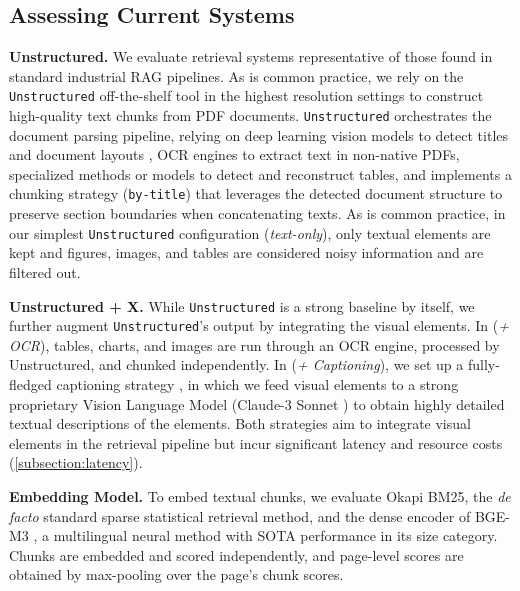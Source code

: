 \subsection{Assessing Current Systems}
\label{subsection:baseline_models}


\noindent\textbf{Unstructured.} We evaluate retrieval systems representative of those found in standard industrial RAG pipelines. As is common practice, we rely on the \texttt{Unstructured} off-the-shelf tool in the highest resolution settings to construct high-quality text chunks from PDF documents. \texttt{Unstructured} orchestrates the document parsing pipeline, relying on deep learning vision models to detect titles and document layouts , OCR engines  to extract text in non-native PDFs, specialized methods or models to detect and reconstruct tables, and implements a chunking strategy (\texttt{by-title}) that leverages the detected document structure to preserve section boundaries when concatenating texts. As is common practice, in our simplest \texttt{Unstructured} configuration (\textit{text-only}), only textual elements are kept and figures, images, and tables are considered noisy information and are filtered out.

\noindent\textbf{Unstructured + X.} While \texttt{Unstructured} is a strong baseline by itself, we further augment \texttt{Unstructured}'s output by integrating the visual elements. In (\textit{+ OCR}), tables, charts, and images are run through an OCR engine, processed by Unstructured, and chunked independently. In (\textit{+ Captioning}), we set up a fully-fledged captioning strategy , in which we feed visual elements to a strong proprietary Vision Language Model (Claude-3 Sonnet ) to obtain highly detailed textual descriptions of the elements.
Both strategies aim to integrate visual elements in the retrieval pipeline but incur significant latency and resource costs (\autoref{subsection:latency}).


\noindent\textbf{Embedding Model.} To embed textual chunks, we evaluate Okapi BM25, the \textit{de facto} standard sparse statistical retrieval method, and the dense encoder of BGE-M3 , a multilingual neural method with SOTA performance in its size category. Chunks are embedded and scored independently, and page-level scores are obtained by max-pooling over the page's chunk scores.


